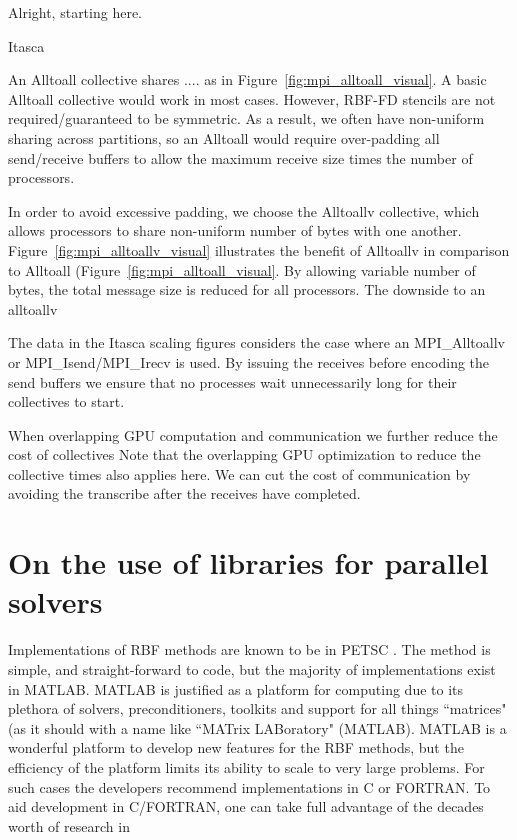 Alright, starting here.


Itasca

An Alltoall collective shares .... as in Figure~\ref{fig:mpi_alltoall_visual}. A basic Alltoall collective would work in most cases. However, RBF-FD stencils are not required/guaranteed to be symmetric. As a result, we often have non-uniform sharing across partitions, so an Alltoall would require over-padding all send/receive buffers to allow the maximum receive size times the number of processors. 

In order to avoid excessive padding, we choose the Alltoallv collective, which allows processors to share non-uniform number of bytes with one another. Figure~\ref{fig:mpi_alltoallv_visual} illustrates the benefit of Alltoallv in comparison to Alltoall (Figure~\ref{fig:mpi_alltoall_visual}. By allowing variable number of bytes, the total message size is reduced for all processors. The downside to an alltoallv




The data in the Itasca scaling figures considers the case where an MPI\_Alltoallv or MPI\_Isend/MPI\_Irecv is used. By issuing the receives before encoding the send buffers we ensure that no processes wait unnecessarily long for their collectives to start.

When overlapping GPU computation and communication we further reduce the cost of collectives 
Note that the overlapping GPU optimization to reduce the collective times also applies here. We can cut the cost of communication by avoiding the transcribe after the receives have completed. 


\section{On the use of libraries for parallel solvers}

\authnote{$\rightarrow$} 
Implementations of RBF methods are known to be in PETSC \cite{Yokota2010}. The method is simple, and straight-forward to code, but the majority of implementations exist in MATLAB. MATLAB is justified as a platform for computing due to its plethora of solvers, preconditioners, toolkits and support for all things ``matrices" (as it should with a name like ``MATrix LABoratory" (MATLAB). MATLAB is a wonderful platform to develop new features for the RBF methods, but the efficiency of the platform limits its ability to scale to very large problems. For such cases the developers recommend implementations in C or FORTRAN. To aid development in C/FORTRAN, one can take full advantage of the decades worth of research in

